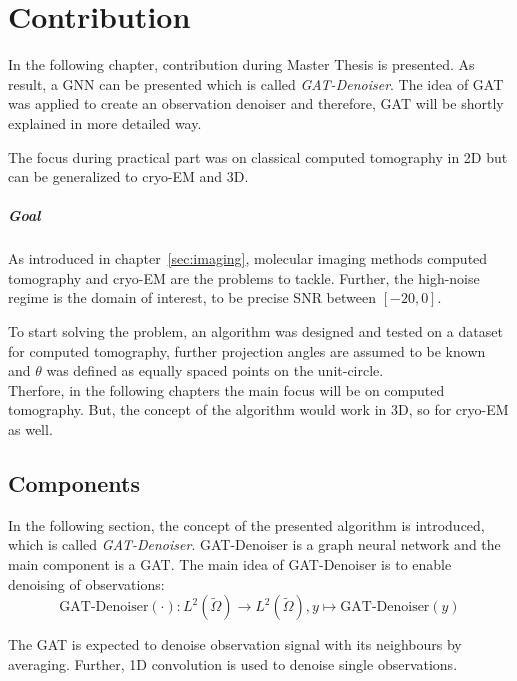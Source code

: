 \chapter{Contribution}
\label{sec:contribution}

In the following chapter, contribution during Master Thesis is presented.
As result, a GNN can be presented which is called \textit{GAT-Denoiser}.
The idea of GAT was applied to create an observation denoiser and therefore, GAT
will be shortly explained in more detailed way.

The focus during practical part was on classical computed tomography in 2D but
can be generalized to cryo-EM and 3D.

\paragraph{Goal}
As introduced in chapter~\ref{sec:imaging}, molecular imaging methods computed tomography and cryo-EM are the problems
to tackle. Further, the high-noise regime is the domain of interest, to be precise SNR between $[-20, 0]$.


\begin{tcolorbox}[colback=red!5!white,colframe=red!75!black]
  To start solving the problem, an algorithm was designed and tested on a dataset for computed tomography, further
  projection angles are assumed to be known and $\theta$ was defined as equally spaced points on the unit-circle. \\

  Therfore, in the following chapters the main focus will be on computed tomography. 
  But, the concept of the algorithm would work in 3D, so for cryo-EM as well.
\end{tcolorbox}


\section{Components}
In the following section, the concept of the presented algorithm is introduced, which is called \textit{GAT-Denoiser}. 
GAT-Denoiser is a graph neural network and the main component is a GAT. 
The main idea of GAT-Denoiser is to enable denoising of observations:
\begin{equation}
  \text{GAT-Denoiser} (\cdot) : L^2(\tilde{\Omega}) \to  L^2(\tilde{\Omega}) , y \mapsto \text{GAT-Denoiser} (y) 
\end{equation}

The GAT is expected to denoise observation signal with its neighbours by averaging. 
Further, 1D convolution is used to denoise single observations.


